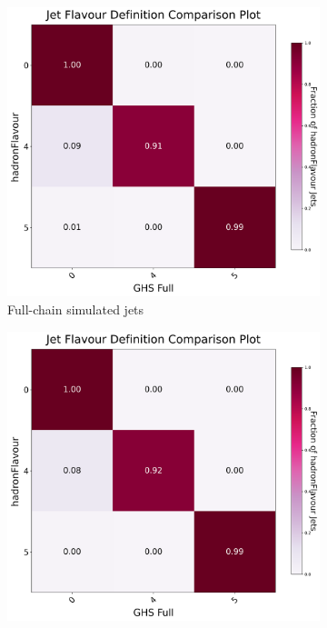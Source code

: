 \documentclass[10pt,twocolumn]{article}
\begin{document}
\begin{figure}[!htbp]
    \centering
    \begin{subfigure}[t]{0.48\textwidth}
        \centering
        \includegraphics[width=\textwidth]{images/compare_matrix_hadronFlavour_vs_GHS_full.png}
        \caption{Full-chain simulated jets}
        \label{fig:reco_jet_compare_matrix_hadronFlavour_vs_GHS_full}
    \end{subfigure}
    \hfill
    \begin{subfigure}[t]{0.48\textwidth}
        \centering
        \includegraphics[width=\textwidth]{images/compare_matrix_GenJet_hadronFlavour_vs_GHS_full.png}

\end{subfigure}
\end{figure}
\end{document}
